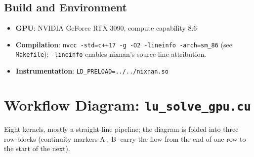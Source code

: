 \documentclass[11pt,a4paper]{article}
\begin{document}
\subsection{Build and Environment}
\begin{itemize}
  \item \textbf{GPU}: NVIDIA GeForce RTX 3090, compute capability 8.6
  \item \textbf{Compilation}: \texttt{nvcc -std=c++17 -g -O2 -lineinfo -arch=sm\_86}
    (see \texttt{Makefile}); \texttt{-lineinfo} enables nixnan's
    source-line attribution.
  \item \textbf{Instrumentation}: \texttt{LD\_PRELOAD=../../nixnan.so}
\end{itemize}

\section{Workflow Diagram: \texttt{lu\_solve\_gpu.cu}}
\label{sec:workflow}

Eight kernels, mostly a straight-line pipeline; the diagram is folded into
three row-blocks (continuity markers \textcircled{\scriptsize A},
\textcircled{\scriptsize B} carry the flow from the end of one row to the
start of the next).
\end{document}
